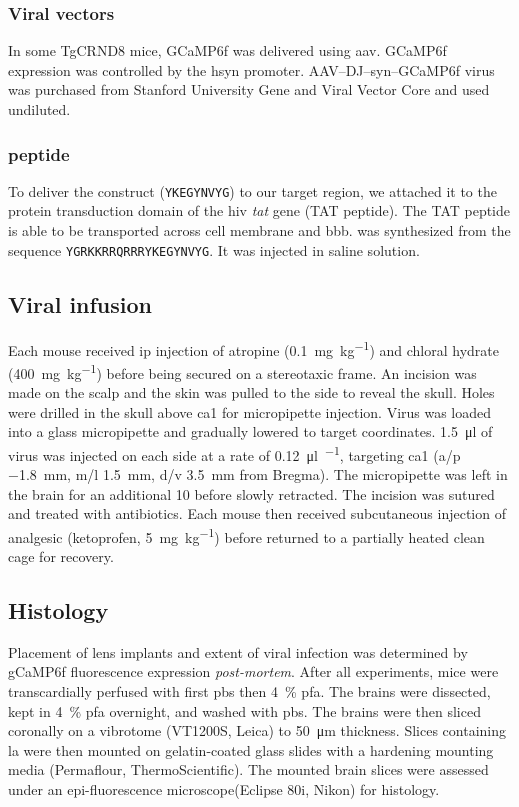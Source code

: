 \subsubsection{Viral vectors}
In some TgCRND8 mice, GCaMP6f was delivered using \gls{aav}. GCaMP6f expression was controlled by the \gls{hsyn} promoter. AAV--DJ--syn--GCaMP6f virus was purchased from Stanford University Gene and Viral Vector Core and used undiluted. 

\subsubsection{\tglu{} peptide}
To deliver the \glu{} construct (\texttt{YKEGYNVYG}) to our target region, we attached it to the protein transduction domain of the \gls{hiv} \textit{tat} gene (TAT peptide). The TAT peptide is able to be transported across cell membrane and \gls{bbb}. \tglu{} was synthesized from the sequence \texttt{YGRKKRRQRRRYKEGYNVYG}. It was injected in saline solution.


\subsection{Viral infusion}

Each mouse received \gls{ip} injection of atropine (\SI{0.1}{\mg\per\kg}) and chloral hydrate (\SI{400}{\mg\per\kg}) before being secured on a stereotaxic frame. An incision was made on the scalp and the skin was pulled to the side to reveal the skull. Holes were drilled in the skull above \gls{ca1} for micropipette injection. Virus was loaded into a glass micropipette and gradually lowered to target coordinates. \SI{1.5}{\ul} of virus was injected on each side at a rate of \SI{0.12}{\ul\per\min}, targeting \gls{ca1} (\gls{a/p} \SI{-1.8}{\mm}, \gls{m/l} \SI{1.5}{\mm}, \gls{d/v} \SI{3.5}{\mm} from Bregma). The micropipette was left in the brain for an additional \SI{10}{\min} before slowly retracted. The incision was sutured and treated with antibiotics. Each mouse then received subcutaneous injection of analgesic (ketoprofen, \SI{5}{\mg\per\kg}) before returned to a partially heated clean cage for recovery.

\subsection{Histology}
Placement of lens implants and extent of viral infection was determined by gCaMP6f fluorescence expression \textit{post-mortem}. After all experiments, mice were transcardially perfused with first \gls{pbs} then \SI{4}{\percent} \gls{pfa}. The brains were dissected,  kept in \SI{4}{\percent} \gls{pfa} overnight, and washed with \gls{pbs}. The brains were then sliced coronally on a vibrotome (VT1200S, Leica) to \SI{50}{\um} thickness. Slices containing \gls{la} were then mounted on gelatin-coated glass slides with a hardening mounting media (Permaflour, ThermoScientific). The mounted brain slices were assessed under an epi-fluorescence microscope(Eclipse 80i, Nikon) for histology.


